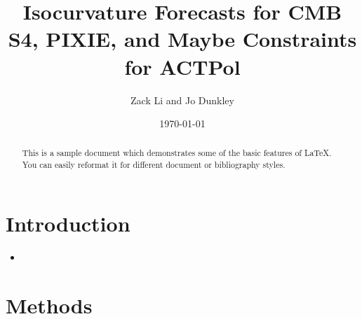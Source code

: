 \documentclass[11pt,a4paper]{emulateapj}
\begin{document}
\title{Isocurvature Forecasts for CMB S4, PIXIE, and Maybe Constraints for ACTPol}
\author{Zack Li and Jo Dunkley}
\date{\today}


\begin{abstract}
This is a sample document which demonstrates some of the basic features
of \LaTeX.  You can easily reformat it for different document or bibliography styles.
\end{abstract}

\section{Introduction}

\begin{itemize}
\item 
\end{itemize}

\section{Methods}
\end{document}
